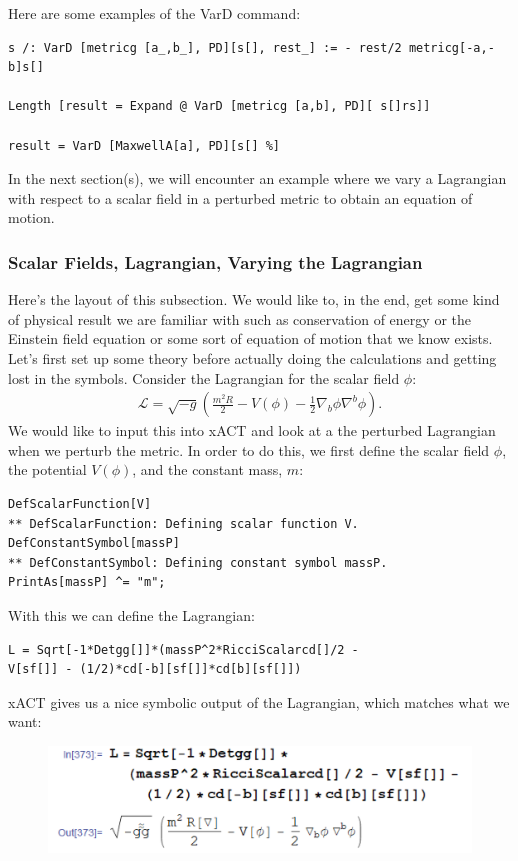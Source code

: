\documentclass{book}
\theoremstyle{definition}
\newcommand{\lag}{\mathcal{L}}
\newcommand{\f}[2]{\frac{#1}{#2}}
\newcommand{\lp}{\left(}
\newcommand{\rp}{\right)}
\begin{document}
Here are some examples of the VarD command:
\begin{lstlisting}
s /: VarD [metricg [a_,b_], PD][s[], rest_] := - rest/2 metricg[-a,-b]s[]

Length [result = Expand @ VarD [metricg [a,b], PD][ s[]rs]]

result = VarD [MaxwellA[a], PD][s[] %]
\end{lstlisting}

In the next section(s), we will encounter an example where we vary a Lagrangian
with respect to a scalar field in a perturbed metric to obtain an equation of
motion.














\subsubsection{Scalar Fields, Lagrangian, Varying the Lagrangian}

Here's the layout of this subsection. We would like to, in the end, get some kind of physical result we are familiar with such as conservation of energy or the Einstein field equation or some sort of equation of motion that we know exists. \\

Let's first set up some theory before actually doing the calculations and getting lost in the symbols. Consider the Lagrangian for the scalar field $\phi$:
\begin{align}
\lag = \sqrt{-g} \lp \f{m^2 R}{2} - V(\phi) - \f{1}{2}\nabla_b \phi \nabla^b \phi \rp.
\end{align}
We would like to input this into xACT and look at a the perturbed Lagrangian when we perturb the metric. In order to do this, we first define the scalar field $\phi$, the potential $V(\phi)$, and the constant mass, $m$: 
\begin{lstlisting}
DefScalarFunction[V]
** DefScalarFunction: Defining scalar function V. 
DefConstantSymbol[massP]
** DefConstantSymbol: Defining constant symbol massP. 
PrintAs[massP] ^= "m";
\end{lstlisting}
With this we can define the Lagrangian:
\begin{lstlisting}
L = Sqrt[-1*Detgg[]]*(massP^2*RicciScalarcd[]/2 - 
V[sf[]] - (1/2)*cd[-b][sf[]]*cd[b][sf[]])
\end{lstlisting}
xACT gives us a nice symbolic output of the Lagrangian, which matches what we want:
\begin{figure}[!htb]
	\includegraphics[scale=0.2]{lag-xact}
\end{figure}
\end{document}
